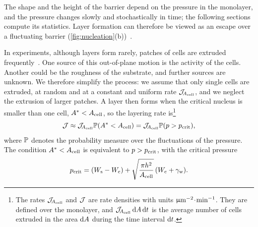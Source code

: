 \documentclass[aps,pre,reprint,superscriptaddress,longbibliography,nofootinbib
]{revtex4-2}
\begin{document}
The shape and the height of the barrier depend on the
pressure in the monolayer, and the pressure changes slowly
and stochastically in time; the following sections compute
its statistics. Layer formation can therefore be viewed as
an escape over a fluctuating barrier
(\cref{fig:nucleation}(b))~\cite{reimann1995thermally}.

In experiments, although layers form rarely, patches of
cells are extruded frequently~\cite{copenhagen2021}. One
source of this out-of-plane motion is the activity of the
cells. Another could be the roughness of the substrate, and
further sources are unknown. We therefore simplify the
process: we assume that only single cells are extruded, at
random and at a constant and uniform rate
$\mathcal{J}_{\!{A_{\rm cell}}}$, and we neglect the extrusion of larger
patches. A layer then forms when the critical nucleus is
smaller than one cell, $A^*<{A_{\rm cell}}$, so the layering rate
is\footnote{The rates $\mathcal{J}_{\!{A_{\rm cell}}}$ and $\mathcal{J}$
are rate densities with units
$\upmu\mathrm{m}^{-2}\mkern1mu\mathord{\cdot}\mkern1mu\text{min}^{-1}$. They are defined over the
monolayer, and $\mathcal{J}_{\!{A_{\rm cell}}}\,\mathrm{d} A\,\mathrm{d} t$ is the
average number of cells extruded in the area $\mathrm{d} A$ during
the time interval $\mathrm{d} t$.}
\begin{equation}
  \label{eq:layering-rate-approximation}
 \mathcal{J} \approx \mathcal{J}_{\!{A_{\rm cell}}}  \mathbb{P}(A^* < {A_{\rm cell}}) = \mathcal{J}_{\!{A_{\rm cell}}}  \mathbb{P}(p>p_{\rm crit}),
\end{equation}
where $\mathbb{P}$ denotes the probability measure over the
fluctuations of the pressure. The condition $A^*<{A_{\rm cell}}$ is
equivalent to $p>p_{\rm crit}$, with the critical pressure
\begin{equation}
  \label{eq:pcrit}
  p_{\rm crit} = (W_{\rm s}-W_{\rm c}) + \sqrt{\frac{\pi h^2}{{A_{\rm cell}}}}\,(W_{\rm c}+\gamma_{\rm w}).
\end{equation}
\end{document}
